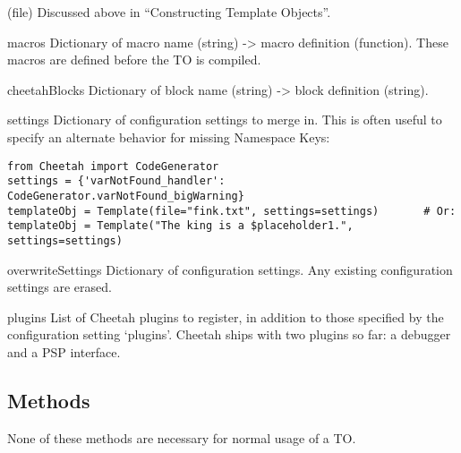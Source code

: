 \begin{description}

\item(file) Discussed above in ``Constructing Template Objects''.

\item{macros} Dictionary of macro name (string) -> macro definition (function).
     These macros are defined before the TO is compiled.

\item{cheetahBlocks} Dictionary of block name (string) -> block definition
     (string).


\item{settings}  Dictionary of configuration settings to merge in.  This is
     often useful to specify an alternate behavior for missing Namespace Keys:
\begin{verbatim}
from Cheetah import CodeGenerator
settings = {'varNotFound_handler': CodeGenerator.varNotFound_bigWarning}
templateObj = Template(file="fink.txt", settings=settings)       # Or:
templateObj = Template("The king is a $placeholder1.", settings=settings)
\end{verbatim}
    

\item{overwriteSettings}  Dictionary of configuration settings.  Any existing
     configuration settings are erased.

\item{plugins}  List of Cheetah plugins to register, in addition to those
     specified by the configuration setting `plugins'.  Cheetah ships with two
     plugins so far: a debugger and a PSP interface.

\end{description}


\subsection{Methods}

None of these methods are necessary for normal usage of a TO.

